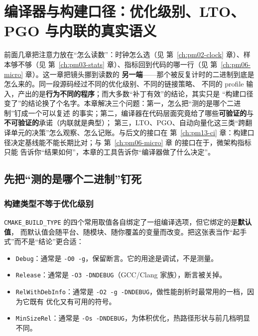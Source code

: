 \documentclass[12pt,a4paper,fontset=fandol]{ctexbook}
\newcommand{\Tp}[1]{\texttt{#1}}
\newcommand{\Bk}{\discretionary{}{}{}}
\begin{document}
\chapter{编译器与构建口径：优化级别、LTO、PGO 与内联的真实语义}
\label{ch:pm10-compiler}

前面几章把注意力放在``怎么读数''：时钟怎么选（见 第~\ref{ch:pm02-clock} 章）、样本够不够（见
第~\ref{ch:pm03-stats} 章）、指标回到代码的哪一行（见 第~\ref{ch:pm06-micro} 章）。这一章把镜头挪到读数的
\textbf{另一端}——那个被反复计时的二进制到底是怎么来的。同一段源码经过不同的优化级别、不同的链接策略、
不同的 profile 输入，产出的是\textbf{行为不同的程序}；而大多数``补丁有效''的结论，其实只是
``构建口径变了''的结论换了个名字。本章解决三个问题：第一，怎么把``测的是哪个二进制''钉成一个可以复述
的事实；第二，编译器在代码层面究竟给了哪些\textbf{可验证的}与\textbf{不可验证的}承诺（内联就是典型）；
第三，LTO、PGO、自动向量化这三类``跨翻译单元的决策''怎么观察、怎么记账。与后文的接口在
第~\ref{ch:pm13-ci} 章：构建口径决定基线能不能长期比对；与 第~\ref{ch:pm06-micro} 章 的接口在于，微架构指标只能
告诉你``结果如何''，本章的工具告诉你``编译器做了什么决定''。

\section{先把``测的是哪个二进制''钉死}
\label{sec:pm10-binary}

\subsection{构建类型不等于优化级别}

\Tp{CMAKE\_{\Bk}BUILD\_{\Bk}TYPE} 的四个常用取值各自绑定了一组编译选项，但它绑定的是\textbf{默认值}，
而默认值会随平台、随模块、随你覆盖的变量而改变。把这张表当作``起手式''而不是``结论''更合适：

\begin{itemize}
  \item \Tp{Debug}：通常是 \Tp{-O0 -g}，保留断言。它的用途是调试，不是测量。
  \item \Tp{Release}：通常是 \Tp{-O3 -DNDEBUG}（GCC/Clang 家族），断言被关掉。
  \item \Tp{RelWithDebInfo}：通常是 \Tp{-O2 -g -DNDEBUG}，做性能剖析时最常用的一档，因为它既有
        优化又有可用的符号。
  \item \Tp{MinSizeRel}：通常是 \Tp{-Os -DNDEBUG}，为体积优化，热路径形状与前几档明显不同。
\end{itemize}
\end{document}
